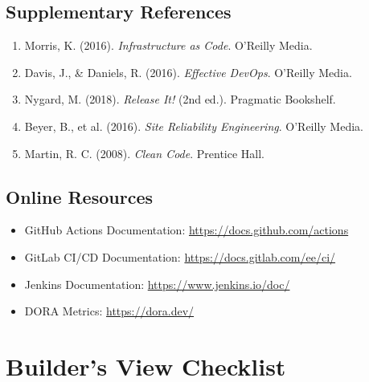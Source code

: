 \documentclass[11pt,letterpaper]{article}
\begin{document}
\subsection{Supplementary References}

\begin{enumerate}[resume]
    \item Morris, K. (2016). \textit{Infrastructure as Code}. O'Reilly Media.
    
    \item Davis, J., \& Daniels, R. (2016). \textit{Effective DevOps}. O'Reilly Media.
    
    \item Nygard, M. (2018). \textit{Release It!} (2nd ed.). Pragmatic Bookshelf.
    
    \item Beyer, B., et al. (2016). \textit{Site Reliability Engineering}. O'Reilly Media.
    
    \item Martin, R. C. (2008). \textit{Clean Code}. Prentice Hall.
\end{enumerate}

\subsection{Online Resources}

\begin{itemize}
    \item GitHub Actions Documentation: \url{https://docs.github.com/actions}
    \item GitLab CI/CD Documentation: \url{https://docs.gitlab.com/ee/ci/}
    \item Jenkins Documentation: \url{https://www.jenkins.io/doc/}
    \item DORA Metrics: \url{https://dora.dev/}
\end{itemize}

\appendix

\section{Builder's View Checklist}
\end{document}
